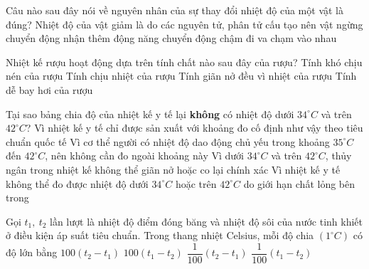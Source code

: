 \begin{ex} 
	Câu nào sau đây nói về nguyên nhân của sự thay đổi nhiệt độ của một vật là đúng? Nhiệt độ của vật giảm là do các nguyên tử, phân tử cấu tạo nên vật
	\choice
	{ngừng chuyển động}
	{nhận thêm động năng}
	{\True chuyển động chậm đi}
	{va chạm vào nhau}
\end{ex}



\begin{ex} 
	Nhiệt kế rượu hoạt động dựa trên tính chất nào sau đây của rượu?
	\choice
	{Tính khó chịu nén của rượu}
	{Tính chịu nhiệt của rượu}
	{\True Tính giãn nở đều vì nhiệt của rượu}
	{Tính dễ bay hơi của rượu}
\end{ex}

\begin{ex} 
	Tại sao bảng chia độ của nhiệt kế y tế lại \textbf{không} có nhiệt độ dưới $34^\circ C$ và trên $42^\circ C$?
	\choice
	{Vì nhiệt kế y tế chỉ được sản xuất với khoảng đo cố định như vậy theo tiêu chuẩn quốc tế}
	{\True Vì cơ thể người có nhiệt độ dao động chủ yếu trong khoảng $35^\circ C$ đến $42^\circ C$, nên không cần đo ngoài khoảng này}
	{Vì dưới $34^\circ C$ và trên $42^\circ C$, thủy ngân trong nhiệt kế không thể giãn nở hoặc co lại chính xác}
	{Vì nhiệt kế y tế không thể đo được nhiệt độ dưới $34^\circ C$ hoặc trên $42^\circ C$ do giới hạn chất lỏng bên trong}
\end{ex}



\begin{ex} 
	Gọi $t_1,\ t_2$ lần lượt là nhiệt độ điểm đóng băng và nhiệt độ sôi của nước tinh khiết ở điều kiện áp suất tiêu chuẩn. Trong thang nhiệt Celsius, mỗi độ chia $\left(1^\circ C\right)$ có độ lớn bằng
	\choice
	{$100\left(t_2-t_1\right)$}
	{$100\left(t_1-t_2\right)$}
	{\True $\dfrac{1}{100}\left(t_2-t_1\right)$}
	{$\dfrac{1}{100}\left(t_1-t_2\right)$}
\end{ex}


